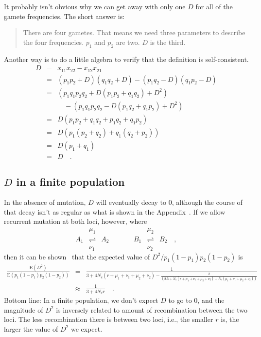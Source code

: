 \documentclass[12pt]{article}
\begin{document}
It probably isn't obvious why we can get away with only one $D$ for
all of the gamete frequencies. The short answer is:
\begin{quote}There are four gametes. That means we need three
  parameters to describe the four frequencies. $p_1$ and $p_2$ are
  two. $D$ is the third.
\end{quote}
Another way is to do a little algebra to verify that the definition is
self-consistent.
\begin{eqnarray*}
D &=& x_{11}x_{22} - x_{12}x_{21} \\
  &=& (p_1p_2 + D)(q_1q_2 + D) - (p_1q_2 - D)(q_1p_2 - D) \\
  &=& \left(p_1q_1p_2q_2 + D(p_1p_2 + q_1q_2) + D^2\right) \\
  && \quad - \left(p_1q_1p_2q_2 - D(p_1q_2 + q_1p_2) + D^2\right) \\
  &=& D(p_1p_2 + q_1q_2 + p_1q_2 + q_1p_2) \\
  &=& D\left(p_1(p_2 + q_2) + q_1(q_2 + p_2)\right) \\
  &=& D(p_1 + q_1) \\
  &=& D \quad.
\end{eqnarray*}

\subsection*{$D$ in a finite population}

In the absence of mutation, $D$ will eventually decay to 0, although
the course of that decay isn't as regular as what is shown in the
Appendix~\cite{Hill-Robertson-1968}. If we allow recurrent mutation at
both loci, however, where
\[
\begin{array}{ccccccc}
    &\mu_1            &     &      &     &\mu_2 \\
A_1 &\rightleftharpoons& A_2 &\qquad& B_1 &\rightleftharpoons& B_2
\quad , \\
    &\nu_1            &     &      &     &\nu_2
\end{array}
\]
then it can be shown~\cite{Ohta-Kimura-1969} that the expected value
of $D^2/p_1(1-p_1)p_2(1-p_2)$ is
{\scriptsize
\begin{eqnarray*}
\frac{\mbox{E}(D^2)}{\mbox{E}(p_1(1-p_1)p_2(1-p_2))}
&=& \frac{1}{3 + 4N_e(r+\mu_1+\nu_1+\mu_2+\nu_2)
                           - \frac{2}{(2.5 + N_e(r+\mu_1+\nu_1+\mu_2+\nu_2)
                              + N_e(\mu_1+\nu_1+\mu_2+\nu_2))}} \\
&\approx& \frac{1}{3 + 4N_er} \quad .
\end{eqnarray*}}
Bottom line: In a finite population, we don't expect $D$ to go to 0,
and the magnitude of $D^2$ is inversely related to amount of
recombination between the two loci. The less recombination there is
between two loci, i.e., the smaller $r$ is, the larger the value of
$D^2$ we expect.
\end{document}

